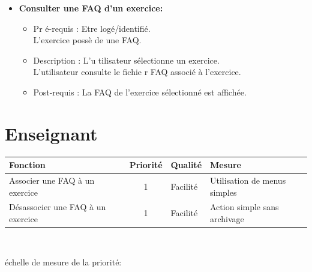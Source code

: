 	\begin{itemize}
	\item {\bf Consulter une FAQ d'un exercice:}
		\begin{itemize}
		\item Pr	{\'e}-requis : Etre log{\'e}/identifi{\'e}.\\
		L'exercice poss{\`e}	de une FAQ.
		\item Description :  L'u	tilisateur s{\'e}lectionne un exercice.\\
		L'utilisateur consulte le fichie	r FAQ associ{\'e} {\`a} l'exercice.
		\item Post-requis : La FAQ de l'exercice	 s{\'e}lectionn{\'e} est affich{\'e}e.
		\end{itemize}			
	\end{itemize}	


\section*{Enseignant}

\begin{tabular}{|p{4cm}|c|p{4cm}|p{5cm}|}
\hline
Fonction & Priorit{\'e} & Qualit{\'e} & Mesure \\
\hline
Associer une FAQ {\`a} un exercice & 1 & Facilit{\'e} & Utilisation de menus simples\\
\hline
D{\'e}sassocier une FAQ {\`a} un exercice & 1 & Facilit{\'e} & Action simple sans archivage\\
\hline
\end{tabular}\\

\begin{center}
{\'e}chelle de mesure de la priorit{\'e}:

\end{center}

